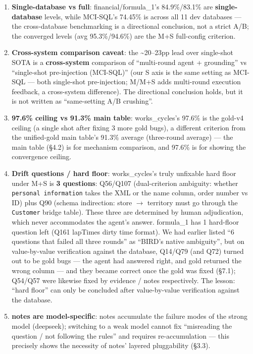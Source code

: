 \documentclass[11pt]{article}
\begin{document}
\begin{enumerate}
\def\labelenumi{\arabic{enumi}.}
\item
  \textbf{Single-database vs full}: financial/formula\_1's 84.9\%/83.1\% are \textbf{single-database} levels, while MCI-SQL's 74.45\% is across all 11 dev databases --- the cross-database benchmarking is a directional conclusion, not a strict A/B; the converged levels (avg 95.3\%/94.6\%) are the M+S full-config criterion.
\item
  \textbf{Cross-system comparison caveat}: the \textasciitilde20--23pp lead over single-shot SOTA is a \textbf{cross-system} comparison of ``multi-round agent + grounding'' vs ``single-shot pre-injection (MCI-SQL)'' (our S axis is the same setting as MCI-SQL --- both single-shot pre-injection; M/M+S adds multi-round execution feedback, a cross-system difference). The directional conclusion holds, but it is not written as ``same-setting A/B crushing''.
\item
  \textbf{97.6\% ceiling vs 91.3\% main table}: works\_cycles's 97.6\% is the gold-v4 ceiling (a single shot after fixing 3 more gold bugs), a different criterion from the unified-gold main table's 91.3\% average (three-round average) --- the main table (\S{}4.2) is for mechanism comparison, and 97.6\% is for showing the convergence ceiling.
\item
  \textbf{Drift questions / hard floor}: works\_cycles's truly unfixable hard floor under M+S is \textbf{3 questions}: Q56/Q107 (dual-criterion ambiguity: whether \texttt{personal\ information} takes the XML or the name column, order number vs ID) plus Q90 (schema indirection: store $\rightarrow$ territory must go through the \texttt{Customer} bridge table). These three are determined by human adjudication, which never accommodates the agent's answer. formula\_1 has 1 hard-floor question left (Q161 lapTimes dirty time format). We had earlier listed ``6 questions that failed all three rounds'' as ``BIRD's native ambiguity'', but on value-by-value verification against the database, Q14/Q79 (and Q72) turned out to be gold bugs --- the agent had answered right, and gold returned the wrong column --- and they became correct once the gold was fixed (\S{}7.1); Q54/Q57 were likewise fixed by evidence / notes respectively. The lesson: ``hard floor'' can only be concluded after value-by-value verification against the database.
\item
  \textbf{notes are model-specific}: notes accumulate the failure modes of the strong model (deepseek); switching to a weak model cannot fix ``misreading the question / not following the rules'' and requires re-accumulation --- this precisely shows the necessity of notes' layered pluggability (\S{}3.3).
\end{enumerate}
\end{document}
